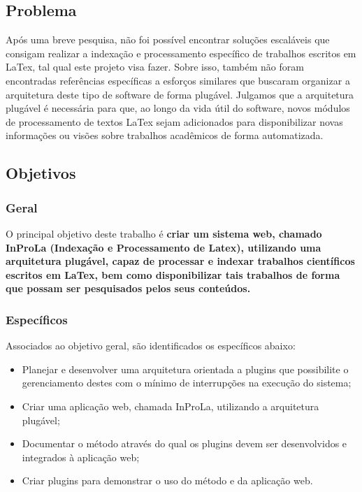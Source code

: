 \documentclass[12pt]{article}
\begin{document}
\subsection{Problema}

Após uma breve pesquisa, não foi possível encontrar soluções escaláveis que consigam realizar a indexação e processamento específico de trabalhos escritos em LaTex, tal qual este projeto visa fazer. Sobre isso, também não foram encontradas referências específicas  a esforços similares que buscaram organizar a arquitetura deste tipo de software de forma plugável. 
Julgamos que a arquitetura plugável é necessária para que, ao longo da vida útil do software, novos módulos de processamento de textos LaTex sejam adicionados para disponibilizar novas informações ou visões sobre trabalhos acadêmicos de forma automatizada.

\subsection{Objetivos}

\subsubsection{Geral}
O principal objetivo deste trabalho é \textbf{criar um sistema web, chamado InProLa (Indexação e Processamento de Latex), utilizando uma arquitetura plugável, capaz de processar e indexar trabalhos científicos escritos em LaTex, bem como disponibilizar tais trabalhos de forma que possam ser pesquisados pelos seus conteúdos.}

\subsubsection{Específicos}

Associados ao objetivo geral, são identificados os específicos abaixo:

\begin{itemize}
    \item Planejar e desenvolver uma arquitetura orientada a plugins que possibilite o gerenciamento destes com o mínimo de interrupções na execução do sistema;
    \item Criar uma aplicação web, chamada InProLa, utilizando a arquitetura plugável;
    \item Documentar o método através do qual  os plugins devem ser  desenvolvidos e integrados à aplicação web;
    \item Criar plugins para demonstrar o uso do método e da aplicação web.
\end{itemize}
\end{document}
